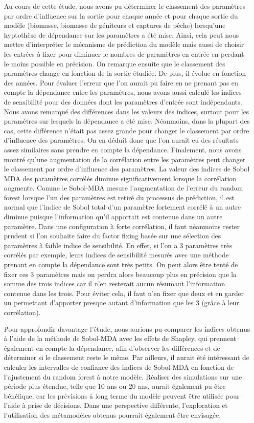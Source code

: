 \documentclass[
]{article}
\begin{document}
Au cours de cette étude, nous avons pu déterminer le classement des
paramètres par ordre d'influence sur la sortie pour chaque année et pour
chaque sortie du modèle (biomasse, biomasse de géniteurs et captures de
pêche) lorsqu'une hyptothèse de dépendance sur les paramètres a été
mise. Ainsi, cela peut nous mettre d'interpréter le mécanisme de
prédiction du modèle mais aussi de choisir les entrées à fixer pour
diminuer le nombres de paramètres en entrée en perdant le moins possible
en précision. On remarque ensuite que le classement des paramètres
change en fonction de la sortie étudiée. De plus, il évolue en fonction
des années. Pour évaluer l'erreur que l'on aurait pu faire en ne prenant
pas en compte la dépendance entre les paramètres, nous avons aussi
calculé les indices de sensibilité pour des données dont les paramètres
d'entrée sont indépendants. Nous avons remarqué des différences dans les
valeurs des indices, surtout pour les paramètres sur lesquels la
dépendance a été mise. Néanmoins, dans la plupart des cas, cette
différence n'était pas assez grande pour changer le classement par ordre
d'influence des paramètres. On en déduit donc que l'on aurait eu des
résultats assez similaires sans prendre en compte la dépendance.
Finalement, nous avons montré qu'une augmentation de la corrélation
entre les paramètres peut changer le classement par ordre d'influence
des paramètres. La valeur des indices de Sobol MDA des paramètres
corrélés diminue significativement lorsque la corrélation augmente.
Comme le Sobol-MDA mesure l'augmentation de l'erreur du random forest
lorsque l'un des paramètres est retiré du processus de prédiction, il
est normal que l'indice de Sobol total d'un paramètre fortement corrélé
à un autre diminue puisque l'information qu'il apportait est contenue
dans un autre paramètre. Dans une configuration à forte corrélation, il
faut néanmoins rester prudent si l'on souhaite faire du factor fixing
basée sur une sélection des paramètres à faible indice de sensibilité.
En effet, si l'on a 3 paramètres très corrélés par exemple, leurs
indices de sensibilité mesurés avec une méthode prenant en compte la
dépendance sont très petits. On peut alors être tenté de fixer ces 3
paramètres mais on perdra alors beaucoup plus en précision que la somme
des trois indices car il n'en resterait aucun résumant l'information
contenue dans les trois. Pour éviter cela, il faut n'en fixer que deux
et en garder un permettant d'apporter presque autant d'information que
les 3 (grâce à leur corrélation).

Pour approfondir davantage l'étude, nous aurions pu comparer les indices
obtenus à l'aide de la méthode de Sobol-MDA avec les effets de Shapley,
qui prennent également en compte la dépendance, afin d'observer les
différences et de déterminer si le classement reste le même. Par
ailleurs, il aurait été intéressant de calculer les intervalles de
confiance des indices de Sobol-MDA en fonction de l'ajustement du random
forest à notre modèle. Réaliser des simulations sur une période plus
étendue, telle que 10 ans ou 20 ans, aurait également pu être bénéfique,
car les prévisions à long terme du modèle peuvent être utilisée pour
l'aide à prise de décisions. Dans une perspective différente,
l'exploration et l'utilisation des métamodèles obtenus pourrait
également être envisagée.
\end{document}
